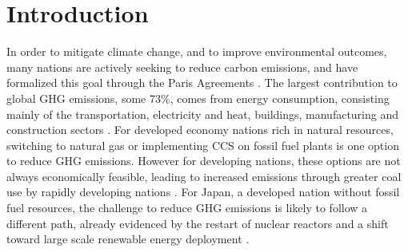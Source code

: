 \section{Introduction} \label{Introduction}
In order to mitigate climate change, and to improve environmental outcomes, many nations are actively seeking to reduce carbon emissions, and have formalized this goal through the Paris Agreements \cite{united_nations_framework_convention_on_climate_change_unfccc_submission_2015}. The largest contribution to global \gls{GHG} emissions, some 73\%, comes from energy consumption, consisting mainly of the transportation, electricity and heat, buildings, manufacturing and construction sectors \cite{ge_4_2020}. For developed economy nations rich in natural resources, switching to natural gas or implementing \gls{CCS} on fossil fuel plants is one option to reduce GHG emissions. However for developing nations, these options are not always economically feasible, leading to increased emissions through greater coal use by rapidly developing nations \cite{international_energy_agency_latest_2019}. For Japan, a developed nation without fossil fuel resources, the challenge to reduce GHG emissions is likely to follow a different path, already evidenced by the restart of nuclear reactors and a shift toward large scale renewable energy deployment \cite{international_energy_agency_latest_2019}.

